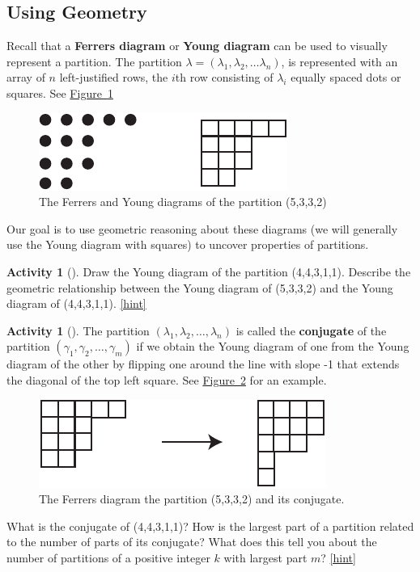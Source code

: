 \documentclass[10pt,]{book}
\newcommand{\terminology}[1]{\textbf{#1}}
\theoremstyle{plain}
\theoremstyle{definition}
\theoremstyle{definition}
\theoremstyle{definition}
\newtheorem{activity}[project]{Activity}
\numberwithin{equation}{chapter}
\begin{document}
\subsection[{Using Geometry}]{Using Geometry}\label{subsec_linearpartitionsgeom}
\hypertarget{p-1497}{}%
Recall that a \terminology{Ferrers diagram} or \terminology{Young diagram} can be used to visually represent a partition.  The partition \(\lambda = (\lambda_1,\lambda_2,\ldots \lambda_n)\), is represented with an array of \(n\) left-justified rows, the \(i\)th row consisting of \(\lambda_i\) equally spaced dots or squares.  See \hyperref[FerrersYoung-repeat]{Figure~\ref{FerrersYoung-repeat}}%
\begin{figure}
\centering
\includegraphics[width=0.45\linewidth]{images/FerrersYoung}
\caption{The Ferrers and Young diagrams of the partition (5,3,3,2)\label{FerrersYoung-repeat}}
\end{figure}
\hypertarget{p-1498}{}%
Our goal is to use geometric reasoning about these diagrams (we will generally use the Young diagram with squares) to uncover properties of partitions.%
\begin{activity}[]\label{activity-296}
\hypertarget{p-1499}{}%
Draw the Young diagram of the partition (4,4,3,1,1). Describe the geometric relationship between the Young diagram of (5,3,3,2) and the Young diagram of (4,4,3,1,1).%
\hfill{\tiny\hyperlink{a-303}{[hint]}\hypertarget{q-303}{}}\end{activity}
\begin{activity}[]\label{activity-297}
\hypertarget{p-1502}{}%
The partition \((\lambda_1,\lambda_2,\ldots, \lambda_n)\) is called the \terminology{conjugate} of the partition \((\gamma_1,\gamma_2,\ldots, \gamma_m)\) if we obtain the Young diagram of one from the Young diagram of the other by flipping one around the line with slope -1 that extends the diagonal of the top left square. See \hyperref[conjugateYoung]{Figure~\ref{conjugateYoung}} for an example.%
\begin{figure}
\centering
\includegraphics[width=0.5\linewidth]{images/conjugateYoung}
\caption{The Ferrers diagram the partition (5,3,3,2) and its conjugate.\label{conjugateYoung}}
\end{figure}
\hypertarget{p-1503}{}%
What is the conjugate of (4,4,3,1,1)? How is the largest part of a partition related to the number of parts of its conjugate? What does this tell you about the number of partitions of a positive integer \(k\) with largest part \(m\)?%
\hfill{\tiny\hyperlink{a-304}{[hint]}\hypertarget{q-304}{}}\end{activity}
\end{document}
